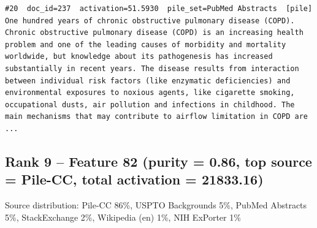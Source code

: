\begin{verbatim}
#20  doc_id=237  activation=51.5930  pile_set=PubMed Abstracts  [pile]
One hundred years of chronic obstructive pulmonary disease (COPD).
Chronic obstructive pulmonary disease (COPD) is an increasing health problem and one of the leading causes of morbidity and mortality worldwide, but knowledge about its pathogenesis has increased substantially in recent years. The disease results from interaction between individual risk factors (like enzymatic deficiencies) and environmental exposures to noxious agents, like cigarette smoking, occupational dusts, air pollution and infections in childhood. The main mechanisms that may contribute to airflow limitation in COPD are ...

\end{verbatim}

\subsection*{Rank 9 -- Feature 82 (purity = 0.86, top source = Pile-CC, total activation = 21833.16)}

Source distribution: Pile-CC 86\%, USPTO Backgrounds 5\%, PubMed Abstracts 5\%, StackExchange 2\%, Wikipedia (en) 1\%, NIH ExPorter 1\%

